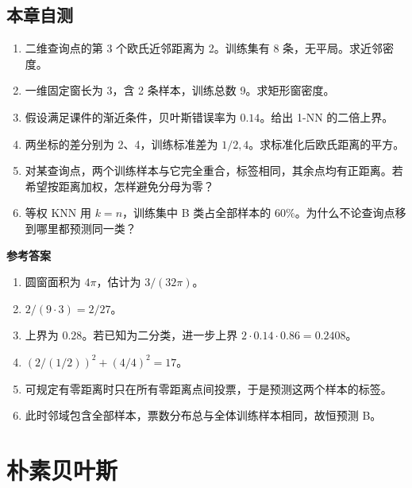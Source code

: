 \documentclass[UTF8,a4paper,zihao=-4,fontset=fandol]{ctexrep}
\begin{document}
\section{本章自测}
\begin{enumerate}
\item 二维查询点的第 3 个欧氏近邻距离为 2。训练集有 8 条，无平局。求近邻密度。
\item 一维固定窗长为 3，含 2 条样本，训练总数 9。求矩形窗密度。
\item 假设满足课件的渐近条件，贝叶斯错误率为 $0.14$。给出 1-NN 的二倍上界。
\item 两坐标的差分别为 2、4，训练标准差为 $1/2,4$。求标准化后欧氏距离的平方。
\item 对某查询点，两个训练样本与它完全重合，标签相同，其余点均有正距离。若希望按距离加权，怎样避免分母为零？
\item 等权 KNN 用 $k=n$，训练集中 B 类占全部样本的 $60\%$。为什么不论查询点移到哪里都预测同一类？
\end{enumerate}
\textbf{参考答案}
\begin{enumerate}
\item 圆窗面积为 $4\pi$，估计为 $3/(32\pi)$。
\item $2/(9\cdot3)=2/27$。
\item 上界为 $0.28$。若已知为二分类，进一步上界 $2\cdot0.14\cdot0.86=0.2408$。
\item $(2/(1/2))^2+(4/4)^2=17$。
\item 可规定有零距离时只在所有零距离点间投票，于是预测这两个样本的标签。
\item 此时邻域包含全部样本，票数分布总与全体训练样本相同，故恒预测 B。
\end{enumerate}

\chapter{朴素贝叶斯}
\label{ch:prml-nb}
\end{document}
